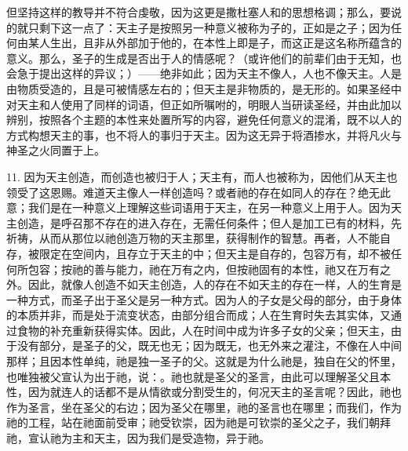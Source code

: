 但坚持这样的教导并不符合虔敬，因为这更是撒杜塞人和的思想格调；那么，要说的就只剩下这一点了：天主子是按照另一种意义被称为子的，正如是之子；因为任何由某人生出，且非从外部加于他的，在本性上即是子，而这正是这名称所蕴含的意义。那么，圣子的生成是否出于人的情感呢？（或许他们的前辈们由于无知，也会急于提出这样的异议；）——绝非如此；因为天主不像人，人也不像天主。人是由物质受造的，且是可被情感左右的；但天主是非物质的，是无形的。如果圣经中对天主和人使用了同样的词语，但正如所嘱咐的，明眼人当研读圣经，并由此加以辨别，按照各个主题的本性来处置所写的内容，避免任何意义的混淆，既不以人的方式构想天主的事，也不将人的事归于天主。因为这无异于将酒掺水，并将凡火与神圣之火同置于上。\par

11. 因为天主创造，而创造也被归于人；天主有，而人也被称为，因他们从天主也领受了这恩赐。难道天主像人一样创造吗？或者祂的存在如同人的存在？绝无此意；我们是在一种意义上理解这些词语用于天主，在另一种意义上用于人。因为天主创造，是呼召那不存在的进入存在，无需任何条件；但人是加工已有的材料，先祈祷，从而从那位以祂创造万物的天主那里，获得制作的智慧。再者，人不能自存，被限定在空间内，且存立于天主的中；但天主是自存的，包容万有，却不被任何所包容；按祂的善与能力，祂在万有之内，但按祂固有的本性，祂又在万有之外。因此，就像人创造不如天主创造，人的存在不如天主的存在一样，人的生育是一种方式，而圣子出于圣父是另一种方式。因为人的子女是父母的部分，由于身体的本质并非，而是处于流变状态，由部分组合而成；人在生育时失去其实体，又通过食物的补充重新获得实体。因此，人在时间中成为许多子女的父亲；但天主，由于没有部分，是圣子的父，既无也无；因为既无，也无外来之灌注，不像在人中间那样；且因本性单纯，祂是独一圣子的父。这就是为什么祂是，独自在父的怀里，也唯独被父宣认为出于祂，说：。祂也就是圣父的圣言，由此可以理解圣父且本性，因为就连人的话都不是从情欲或分割受生的，何况天主的圣言呢？因此，祂也作为圣言，坐在圣父的右边；因为圣父在哪里，祂的圣言也在哪里；而我们，作为祂的工程，站在祂面前受审；祂受钦崇，因为祂是可钦崇的圣父之子，我们朝拜祂，宣认祂为主和天主，因为我们是受造物，异于祂。\par

